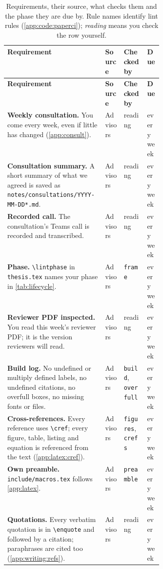 {\small
\begin{xltabular}{\linewidth}{X >{\raggedright\arraybackslash}p{0.12\linewidth} >{\raggedright\arraybackslash}p{0.15\linewidth} >{\raggedright\arraybackslash}p{0.1\linewidth}}
  \caption{Requirements, their source, what checks them and the phase they are due by. Rule names identify lint rules (\cref{app:code:paperci}); \emph{reading} means you check the row yourself.}\label{tab:polish}\\
  \toprule \textbf{Requirement} & \textbf{Source} & \textbf{Checked by} & \textbf{Due} \\ \midrule \endfirsthead
  \toprule \textbf{Requirement} & \textbf{Source} & \textbf{Checked by} & \textbf{Due} \\ \midrule \endhead
  \bottomrule \endlastfoot
  \textbf{Weekly consultation.} You come every week, even if little has changed (\cref{app:consult}). & Advisors & reading & every week \\
  \textbf{Consultation summary.} A short summary of what we agreed is saved as \texttt{notes/consultations/YYYY-MM-DD*.md}. & Advisors & reading & every week \\
  \textbf{Recorded call.} The consultation's Teams call is recorded and transcribed. & Advisors & reading & every week \\
  \textbf{Phase.} \texttt{\textbackslash lintphase} in \texttt{thesis.tex} names your phase in \cref{tab:lifecycle}. & Advisors & \texttt{frame} & every week \\
  \textbf{Reviewer PDF inspected.} You read this week's reviewer PDF; it is the version reviewers will read. & Advisors & reading & every week \\
  \textbf{Build log.} No undefined or multiply defined labels, no undefined citations, no overfull boxes, no missing fonts or files. & Advisors & \texttt{build}, \texttt{overfull} & every week \\
  \textbf{Cross-references.} Every reference uses \texttt{\textbackslash cref}; every figure, table, listing and equation is referenced from the text (\cref{app:latex:cref}). & Advisors & \texttt{figures}, \texttt{crefs} & every week \\
  \textbf{Own preamble.} \texttt{include/macros.tex} follows \cref{app:latex}. & Advisors & \texttt{preamble} & every week \\
  \textbf{Quotations.} Every verbatim quotation is in \texttt{\textbackslash enquote} and followed by a citation; paraphrases are cited too (\cref{app:writing:refs}). & Advisors & reading & every week \\

\end{xltabular}}
